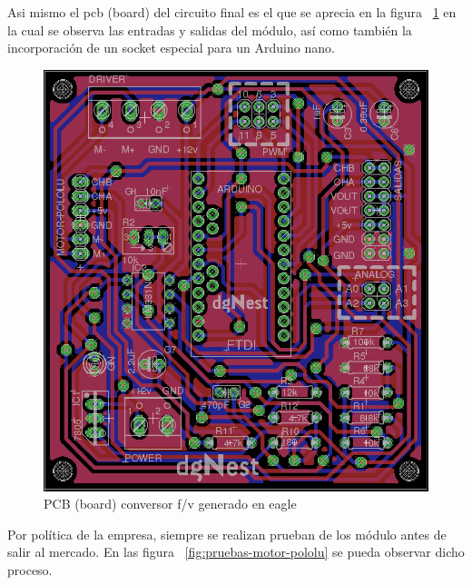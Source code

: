 Asi mismo el pcb (board) del circuito final es el que se aprecia en la figura ~\ref{fig:board-motor-pololu} en la cual se observa las entradas y salidas del módulo, así como también la incorporación de un socket especial para un Arduino nano.

\begin{figure}[h!]
  \centering
  \includegraphics[scale=0.3]{images/activities/motor_pololu/board-motor-pololu.png}
  \caption{PCB (board) conversor f/v generado en eagle}
  \label{fig:board-motor-pololu}
\end{figure}

Por política de la empresa, siempre se realizan prueban de los módulo antes de salir al mercado. En las figura ~\ref{fig:pruebas-motor-pololu} se pueda observar dicho proceso.

